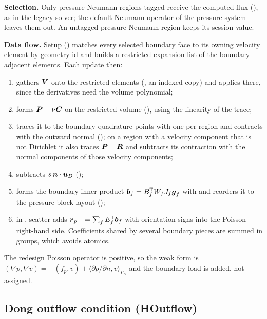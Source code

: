 \textbf{Selection.} Only pressure Neumann regions tagged
 receive the computed flux (),
as in the legacy solver; the default Neumann operator of the pressure system
leaves them out. An untagged pressure Neumann region keeps its session
value.

\textbf{Data flow.} Setup () matches every
selected boundary face to its owning velocity element by geometry id and
builds a restricted expansion list of the boundary-adjacent elements. Each
update then:
\begin{enumerate}
  \item gathers $\boldsymbol{V}$ onto the restricted elements
  (, an indexed copy) and applies
   there, since the derivatives need the volume polynomial;
  \item forms $\boldsymbol{P}-\nu\boldsymbol{C}$ on the restricted volume
  (), using the linearity of the trace;
  \item traces it to the boundary quadrature points with one
   per region and contracts with the outward
  normal (); on a region with a
  velocity component that is not Dirichlet it also traces
  $\boldsymbol{P}-\boldsymbol{R}$ and subtracts its contraction with the normal
  components of those velocity components;
  \item subtracts $s\,\boldsymbol{n}\cdot\boldsymbol{u}_D$
  ();
  \item forms the boundary inner product
  $\boldsymbol{b}_f=B_f^{\mathsf T}W_fJ_f\boldsymbol{g}_f$ with 
  and reorders it to the pressure block layout
  ();
  \item in , scatter-adds
  $\boldsymbol{r}_p\mathrel{+}=\sum_fE_f^{\mathsf T}\boldsymbol{b}_f$ with orientation
  signs into the Poisson right-hand side. Coefficients shared by several
  boundary pieces are summed in groups, which avoids atomics.
\end{enumerate}
The redesign Poisson operator is positive, so the weak form is
$(\nabla p,\nabla v)=-(f_p,v)+\langle\partial p/\partial n,v\rangle_{\Gamma_N}$
and the boundary load is added, not assigned.

\subsection{Dong outflow condition (HOutflow)}
\label{sec:incns-houtflow}


